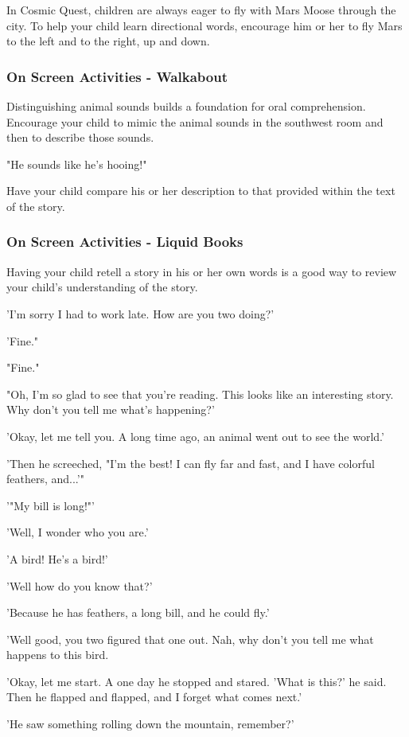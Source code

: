 In Cosmic Quest, children are always eager to fly with Mars Moose through the city.
To help your child learn directional words, encourage him or her to fly Mars to the left and to the right, up and down.

\subsubsection{On Screen Activities - Walkabout}
Distinguishing animal sounds builds a foundation for oral comprehension.
Encourage your child to mimic the animal sounds in the southwest room and then to describe those sounds.

"He sounds like he's hooing!"

Have your child compare his or her description to that provided within the text of the story.

\subsubsection{On Screen Activities - Liquid Books}

Having your child retell a story in his or her own words is a good way to review your child's understanding of the story.

'I'm sorry I had to work late. How are you two doing?'

'Fine."

"Fine."

"Oh, I'm so glad to see that you're reading. This looks like an interesting story. Why don't you tell me what's happening?'

'Okay, let me tell you. A long time ago, an animal went out to see the world.'

'Then he screeched, "I'm the best! I can fly far and fast, and I have colorful feathers, and...'"

'"My bill is long!"'

'Well, I wonder who you are.'

'A bird! He's a bird!'

'Well how do you know that?'

'Because he has feathers, a long bill, and he could fly.'

'Well good, you two figured that one out. Nah, why don't you tell me what happens to this bird.

'Okay, let me start. A one day he stopped and stared. 'What is this?' he said. Then he flapped and flapped, and I forget what comes next.'

'He saw something rolling down the mountain, remember?'

